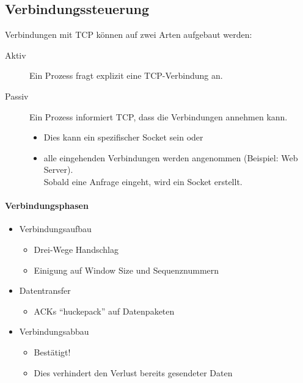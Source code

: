 		\subsection{Verbindungssteuerung}
			Verbindungen mit TCP können auf zwei Arten aufgebaut werden:
			\begin{description}
				\item[Aktiv] Ein Prozess fragt explizit eine TCP-Verbindung an.
				\item[Passiv] Ein Prozess informiert TCP, dass die Verbindungen annehmen kann.
					\begin{itemize}
						\item Dies kann ein spezifischer Socket sein oder
						\item alle eingehenden Verbindungen werden angenommen (Beispiel: Web Server). \\ Sobald eine Anfrage eingeht, wird ein Socket erstellt.
					\end{itemize}
			\end{description}


			\paragraph{Verbindungsphasen}
				\begin{itemize}
					\item Verbindungsaufbau
						\begin{itemize}
							\item Drei-Wege Handschlag
							\item Einigung auf Window Size und Sequenznummern
						\end{itemize}
					\item Datentransfer
						\begin{itemize}
							\item ACKs \enquote{huckepack} auf Datenpaketen
						\end{itemize}
					\item Verbindungsabbau
						\begin{itemize}
							\item Bestätigt!
							\item Dies verhindert den Verlust bereits gesendeter Daten
						\end{itemize}
				\end{itemize}

